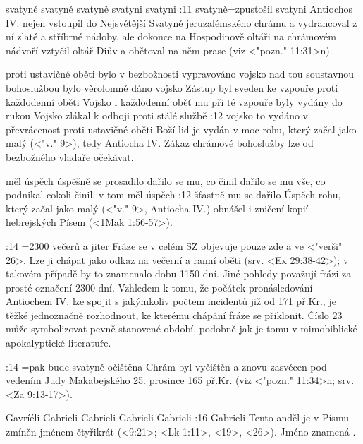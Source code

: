     {svatyně} %
    {svatyně}  %
    {svatyně} %
    {svatyni}  %
    {svatyni}  %
:11 {svatyně}={zpustošil svatyni} Antiochos IV. nejen vstoupil do Nejsvětější Svatyně jeruzalémského chrámu a vydrancoval z ní zlaté a stříbrné nádoby, ale dokonce na Hospodinově oltáři na chrámovém nádvoří vztyčil oltář Diův a obětoval na něm prase (viz <"pozn." 11:31>n).

   {proti ustavičné oběti bylo v bezbožnosti vypravováno vojsko}   %
   {nad tou soustavnou bohoslužbou bylo věrolomně dáno vojsko}   %
   {Zástup byl sveden ke vzpouře proti každodenní oběti}   %
   {Vojsko i každodenní oběť mu při té vzpouře byly vydány do rukou}   %
   {Vojsko zlákal k odboji proti stálé službě}   %
:12 {vojsko to vydáno v převrácenost proti ustavičné oběti} Boží lid je vydán v moc rohu, který začal jako malý (<"v." 9>), tedy Antiocha IV. Zákaz chrámové bohoslužby lze od bezbožného vladaře očekávat.

   {měl úspěch}   %
   {úspěšně se prosadilo}   %
   {dařilo se mu, co činil}   %
   {dařilo se mu vše, co podnikal}   %
   {cokoli činil, v tom měl úspěch}   %
:12 {šťastně mu se dařilo} Úspěch rohu, který začal jako malý (<"v." 9>, Antiocha IV.)
obnášel i zničení kopií hebrejských Písem  (<1Mak 1:56-57>). 

:14 {}={2300 večerů a jiter} Fráze  se v celém SZ objevuje pouze zde a ve <"verši" 26>. Lze ji chápat jako odkaz na večerní a ranní oběti (srv. <Ex 29:38-42>); v takovém případě by to znamenalo dobu 1150 dní. Jiné pohledy považují frázi za prosté označení 2300 dní. Vzhledem k tomu, že počátek pronásledování Antiochem IV. lze spojit s jakýmkoliv počtem incidentů již od 171 př.Kr., je těžké jednoznačně rozhodnout, ke kterému chápání fráze se přiklonit.
Číslo 23 může symbolizovat pevně stanovené období, podobně jak je tomu v mimobiblické apokalyptické literatuře.

:14 {}={pak bude svatyně očištěna}  Chrám byl vyčištěn a znovu zasvěcen pod vedením Judy Makabejského 25. prosince 165 př.Kr. (viz <"pozn." 11:34>n; srv. <Za 9:13-17>).

   {Gavríéli}   %
   {Gabrieli}   %
   {Gabrieli}   %
   {Gabrieli}   %
   {Gabrieli}   %
:16 {Gabrieli} Tento anděl je v Písmu zmíněn jménem čtyřikrát (<9:21>; <Lk 1:11>, <19>, <26>). Jméno znamená .

